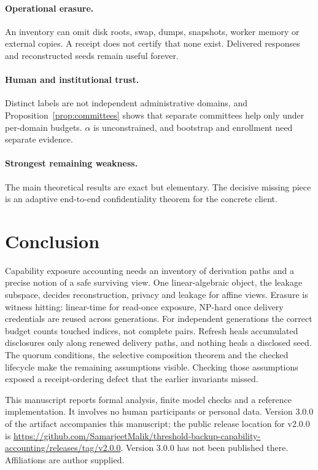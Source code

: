 \documentclass[pdflatex,sn-mathphys-num]{sn-jnl}
\theoremstyle{plain}
\theoremstyle{definition}
\begin{document}
\paragraph{Operational erasure.}
An inventory can omit disk roots, swap, dumps, snapshots, worker memory or external copies. A receipt does not certify that none exist. Delivered responses and reconstructed seeds remain useful forever.

\paragraph{Human and institutional trust.}
Distinct labels are not independent administrative domains, and Proposition~\ref{prop:committees} shows that separate committees help only under per-domain budgets. $\alpha$ is unconstrained, and bootstrap and enrollment need separate evidence.

\paragraph{Strongest remaining weakness.}
The main theoretical results are exact but elementary. The decisive missing piece is an adaptive end-to-end confidentiality theorem for the concrete client.


\section{Conclusion}
Capability exposure accounting needs an inventory of derivation paths and a precise notion of a safe surviving view. One linear-algebraic object, the leakage subspace, decides reconstruction, privacy and leakage for affine views. Erasure is witness hitting: linear-time for read-once exposure, NP-hard once delivery credentials are reused across generations. For independent generations the correct budget counts touched indices, not complete pairs. Refresh heals accumulated disclosures only along renewed delivery paths, and nothing heals a disclosed seed. The quorum conditions, the selective composition theorem and the checked lifecycle make the remaining assumptions visible. Checking those assumptions exposed a receipt-ordering defect that the earlier invariants missed.


\backmatter
{}
This manuscript reports formal analysis, finite model checks and a reference implementation. It involves no human participants or personal data. Version 3.0.0 of the artifact accompanies this manuscript; the public release location for v2.0.0 is \url{https://github.com/SamarjeetMalik/threshold-backup-capability-accounting/releases/tag/v2.0.0}. Version 3.0.0 has not been published there. Affiliations are author supplied.
\end{document}
